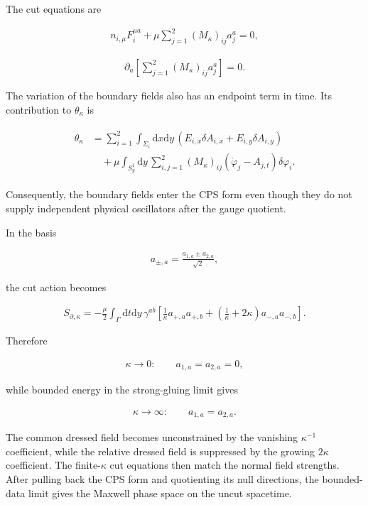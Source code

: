 The cut equations are

\begin{align}
n_{i,\mu}F_i^{\mu a}
+\mu\sum_{j=1}^2(M_\kappa)_{ij}a_j^a=0,
\end{align}

\begin{align}
\partial_a\left[
\sum_{j=1}^2(M_\kappa)_{ij}a_j^a
\right]=0.
\end{align}

The variation of the boundary fields also has an endpoint term in time. Its contribution to $\theta_\kappa$ is

\begin{align}
\begin{aligned}
\theta_\kappa
&=\sum_{i=1}^2\int_{\Sigma_i}\mathrm dx\mathrm dy\,
(E_{i,x}\delta A_{i,x}+E_{i,y}\delta A_{i,y}) \\
&\quad+\mu\int_{S_y^1}\mathrm dy\,
\sum_{i,j=1}^2(M_\kappa)_{ij}
(\dot\varphi_j-A_{j,t})\delta\varphi_i.
\end{aligned}
\end{align}

Consequently, the boundary fields enter the CPS form even though they do not supply independent physical oscillators after the gauge quotient.

In the basis

\begin{align}
a_{\pm,a}=\frac{a_{1,a}\pm a_{2,a}}{\sqrt2},
\end{align}

the cut action becomes

\begin{align}
S_{\partial,\kappa}
=-\frac\mu2\int_\Gamma\mathrm dt\mathrm dy\,
\gamma^{ab}\left[
\frac1\kappa a_{+,a}a_{+,b}
+\left(\frac1\kappa+2\kappa\right)a_{-,a}a_{-,b}
\right].
\end{align}

Therefore

\begin{align}
\kappa\to0:
\qquad
a_{1,a}=a_{2,a}=0,
\end{align}

while bounded energy in the strong-gluing limit gives

\begin{align}
\kappa\to\infty:
\qquad
a_{1,a}=a_{2,a}.
\end{align}

The common dressed field becomes unconstrained by the vanishing $\kappa^{-1}$ coefficient, while the relative dressed field is suppressed by the growing $2\kappa$ coefficient. The finite-$\kappa$ cut equations then match the normal field strengths. After pulling back the CPS form and quotienting its null directions, the bounded-data limit gives the Maxwell phase space on the uncut spacetime.

